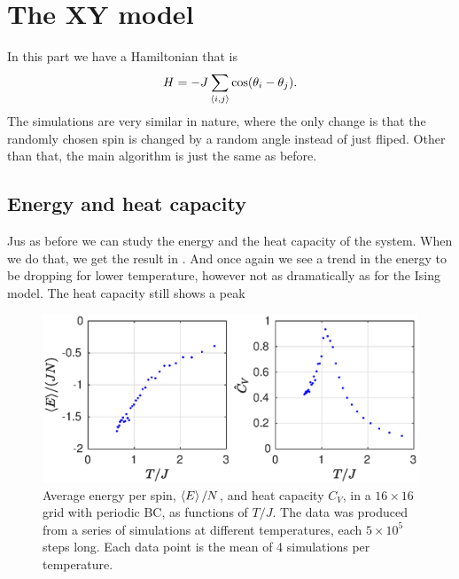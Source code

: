 \documentclass[11pt,letter, swedish, english
]{article}
\begin{document}
\section{The XY model}
In this part we have a Hamiltonian that is
\begin{equation}
H = -J\sum_{\ev{i, j}} \cos(\theta_i - \theta_j).
\end{equation}
The simulations are very similar in nature, where the only change is
that the randomly chosen spin is changed by a random angle instead of
just fliped. Other than that, the main algorithm is just the same as
before. 


\subsection{Energy and heat capacity}
Jus as before we can study the energy and the heat capacity of the
system. When we do that, we get the result in . And
once again we see a trend in the energy to be dropping for lower
temperature, however not as dramatically as for the Ising model. 
The heat capacity still shows a peak

\begin{figure}
\centering
\includegraphics[width=1\textwidth]{XY_ECV_L-16_Nsteps-128.eps}
\caption{Average energy per spin, $\ev{E}/N$, and heat capacity $C_V$,
  in a $16\times16$ grid with periodic BC, as functions of $T/J$. The
  data was produced from a series of simulations at different
  temperatures, each $5\times10^5$ steps long. Each data point is the
  mean of 4 simulations per temperature.} 
\label{fig:ECV2}
\end{figure}
\end{document}
